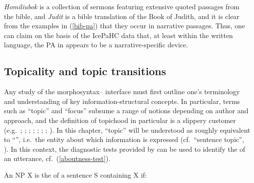\documentclass[output=paper,colorlinks,citecolor=brown]{langscibook}
\begin{document}
\textit{Homiliubok} is a collection of sermons featuring extensive quoted passages from the bible, and \textit{Judit} is a bible translation of the Book of Judith, and it is clear from the examples in (\ref{bib-pa}) that they occur in narrative passages. Thus, one can claim on the basis of the IcePaHC data that, at least within the written language, the PA in  appears to be a narrative-specific device.

\subsection{Topicality and topic transitions}

Any study of the morphosyntax-- interface must first outline one's terminology and understanding of key information-structural concepts. In particular, terms such as ``topic'' and ``focus'' subsume a range of notions depending on author and approach, and the definition of topichood in particular is a slippery customer (e.g.~\citealp{chafe1976givenness}; \citealp{reinhart1981pragmatics}; \citealp{givon1983topic}; \citealp{jacobs2001dimensions}; \citealp{frascarelli2007types}; \citealp{krifka07}; \citealp{neeleman2009syntactic}; \citealp{bianchi2010topic}). In this chapter, ``topic'' will be understood as roughly equivalent to ``'', i.e.~the entity about which information is expressed (cf.~``sentence topic'', \citealp{reinhart1981pragmatics}).
In this context, the diagnostic tests provided by \citet[165]{gotze2007information} can be used to identify the  of an utterance, cf.~(\ref{aboutness-test}).

\ea \label{aboutness-test}  An NP X is the  of a sentence S containing X if:\\
\z 
\z
 
\end{document}
